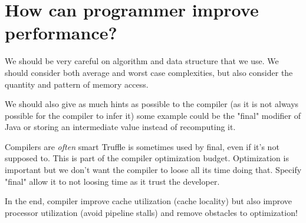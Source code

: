 \section{How can programmer improve performance?}
We should be very careful on algorithm and data structure that we use. We should
consider both average and worst case complexities, but also consider the
quantity and pattern of memory access. 

We should also give as much hints as possible to the compiler (as it is not
always possible for the compiler to infer it) some example could be the "final"
modifier of Java or storing an intermediate value instead of recomputing it.

Compilers are \textit{often} smart Truffle is sometimes used by final, even if
it's not supposed to. This is part of the compiler optimization budget.
Optimization is important but we don't want the compiler to loose all its time
doing that. Specify "final" allow it to not loosing time as it trust the developer.

In the end, compiler improve cache utilization (cache locality) but also improve
processor utilization (avoid pipeline stalls) and remove obstacles to optimization!